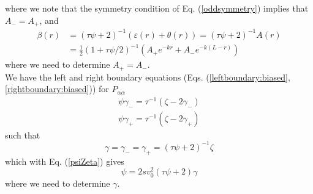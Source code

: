 \documentclass[pre,aps,superscriptaddress,nofootinbib]{revtex4}
\begin{document}
where we note that the symmetry condition of Eq. (\ref{oddsymmetry}) implies that $A_- = A_+$, and
\begin{equation}
\begin{aligned}
\beta(r) &= (\tau\psi + 2)^{-1}(\varepsilon(r) + \theta(r)) = (\tau \psi + 2)^{-1} A(r)\\
&= \frac{1}{2}(1 + \tau\psi/2)^{-1}(A_+ e^{-k r} + A_- e^{-k (L - r)})
\end{aligned}
\end{equation}
where we need to determine $A_+ = A_-$.\\

We have the left and right boundary equations (Eqs. (\ref{leftboundary:biased}, \ref{rightboundary:biased})) for $P_{\alpha\alpha}$
\begin{eqnarray}
\psi \gamma_- = \tau^{-1} (\zeta - 2 \gamma_-)\\
\psi \gamma_+ = \tau^{-1} (\zeta - 2 \gamma_+)
\end{eqnarray}
such that
\begin{equation}
\gamma = \gamma_- = \gamma_+ = (\tau \psi + 2)^{-1} \zeta
\end{equation}
which with Eq. (\ref{psiZeta}) gives
\begin{equation}
\psi = 2 s v_0^2 (\tau \psi + 2) \gamma
\label{gammaPsi}
\end{equation}
where we need to determine $\gamma$.\\
\end{document}
